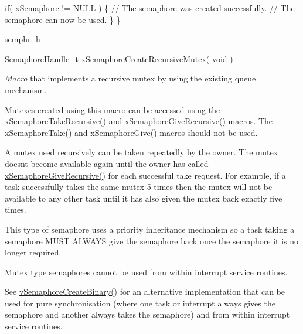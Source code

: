 \begin{DoxyPre}   if( xSemaphore != NULL )
   \{
       // The semaphore was created successfully.
       // The semaphore can now be used.
   \}
\}
\end{DoxyPre}


semphr. h 
\begin{DoxyPre}SemaphoreHandle\_t \hyperlink{semphr_8h_a1bbc843be5a41ea83d2693b2189fc0f8}{xSemaphoreCreateRecursiveMutex( void )}\end{DoxyPre}


{\itshape Macro} that implements a recursive mutex by using the existing queue mechanism.

Mutexes created using this macro can be accessed using the \hyperlink{semphr_8h_ad395f4bba51eea6af3397d72bc079e4d}{x\+Semaphore\+Take\+Recursive()} and \hyperlink{semphr_8h_a398d66b17856c22dd49d39aaac42f105}{x\+Semaphore\+Give\+Recursive()} macros. The \hyperlink{semphr_8h_af116e436d2a5ae5bd72dbade2b5ea930}{x\+Semaphore\+Take()} and \hyperlink{semphr_8h_aae55761cabfa9bf85c8f4430f78c0953}{x\+Semaphore\+Give()} macros should not be used.

A mutex used recursively can be \textquotesingle{}taken\textquotesingle{} repeatedly by the owner. The mutex doesn\textquotesingle{}t become available again until the owner has called \hyperlink{semphr_8h_a398d66b17856c22dd49d39aaac42f105}{x\+Semaphore\+Give\+Recursive()} for each successful \textquotesingle{}take\textquotesingle{} request. For example, if a task successfully \textquotesingle{}takes\textquotesingle{} the same mutex 5 times then the mutex will not be available to any other task until it has also \textquotesingle{}given\textquotesingle{} the mutex back exactly five times.

This type of semaphore uses a priority inheritance mechanism so a task \textquotesingle{}taking\textquotesingle{} a semaphore M\+U\+ST A\+L\+W\+A\+YS \textquotesingle{}give\textquotesingle{} the semaphore back once the semaphore it is no longer required.

Mutex type semaphores cannot be used from within interrupt service routines.

See \hyperlink{semphr_8h_ae10bffadd26fbd5bcce76bf33a83ef30}{v\+Semaphore\+Create\+Binary()} for an alternative implementation that can be used for pure synchronisation (where one task or interrupt always \textquotesingle{}gives\textquotesingle{} the semaphore and another always \textquotesingle{}takes\textquotesingle{} the semaphore) and from within interrupt service routines.

